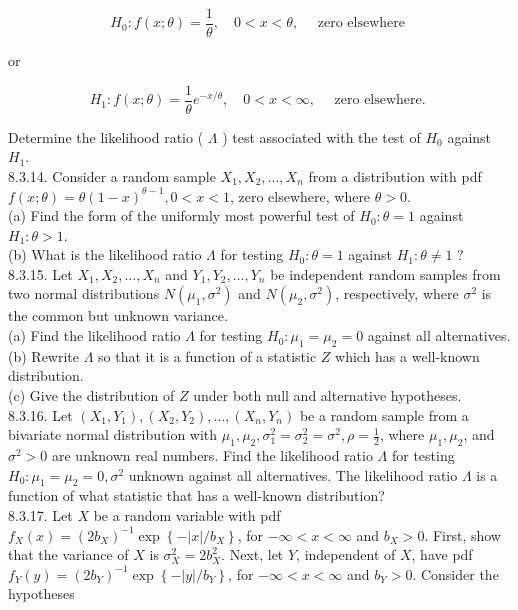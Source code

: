 $$
H_{0}: f(x ; \theta)=\frac{1}{\theta}, \quad 0<x<\theta, \quad \text { zero elsewhere }
$$

or

$$
H_{1}: f(x ; \theta)=\frac{1}{\theta} e^{-x / \theta}, \quad 0<x<\infty, \quad \text { zero elsewhere. }
$$

Determine the likelihood ratio ( $\Lambda$ ) test associated with the test of $H_{0}$ against $H_{1}$.\\
8.3.14. Consider a random sample $X_{1}, X_{2}, \ldots, X_{n}$ from a distribution with pdf $f(x ; \theta)=\theta(1-x)^{\theta-1}, 0<x<1$, zero elsewhere, where $\theta>0$.\\
(a) Find the form of the uniformly most powerful test of $H_{0}: \theta=1$ against $H_{1}: \theta>1$.\\
(b) What is the likelihood ratio $\Lambda$ for testing $H_{0}: \theta=1$ against $H_{1}: \theta \neq 1$ ?\\
8.3.15. Let $X_{1}, X_{2}, \ldots, X_{n}$ and $Y_{1}, Y_{2}, \ldots, Y_{n}$ be independent random samples from two normal distributions $N\left(\mu_{1}, \sigma^{2}\right)$ and $N\left(\mu_{2}, \sigma^{2}\right)$, respectively, where $\sigma^{2}$ is the common but unknown variance.\\
(a) Find the likelihood ratio $\Lambda$ for testing $H_{0}: \mu_{1}=\mu_{2}=0$ against all alternatives.\\
(b) Rewrite $\Lambda$ so that it is a function of a statistic $Z$ which has a well-known distribution.\\
(c) Give the distribution of $Z$ under both null and alternative hypotheses.\\
8.3.16. Let $\left(X_{1}, Y_{1}\right),\left(X_{2}, Y_{2}\right), \ldots,\left(X_{n}, Y_{n}\right)$ be a random sample from a bivariate normal distribution with $\mu_{1}, \mu_{2}, \sigma_{1}^{2}=\sigma_{2}^{2}=\sigma^{2}, \rho=\frac{1}{2}$, where $\mu_{1}, \mu_{2}$, and $\sigma^{2}>0$ are unknown real numbers. Find the likelihood ratio $\Lambda$ for testing $H_{0}: \mu_{1}=\mu_{2}=0, \sigma^{2}$ unknown against all alternatives. The likelihood ratio $\Lambda$ is a function of what statistic that has a well-known distribution?\\
8.3.17. Let $X$ be a random variable with pdf $f_{X}(x)=\left(2 b_{X}\right)^{-1} \exp \left\{-|x| / b_{X}\right\}$, for $-\infty<x<\infty$ and $b_{X}>0$. First, show that the variance of $X$ is $\sigma_{X}^{2}=2 b_{X}^{2}$. Next, let $Y$, independent of $X$, have pdf $f_{Y}(y)=\left(2 b_{Y}\right)^{-1} \exp \left\{-|y| / b_{Y}\right\}$, for $-\infty<x<\infty$ and $b_{Y}>0$. Consider the hypotheses

